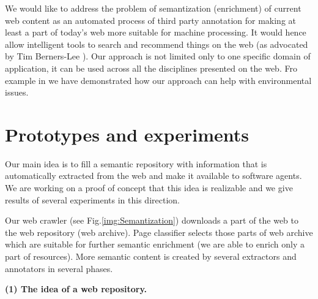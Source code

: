 \documentclass{sig-alternate}
\begin{document}
We would like to address the problem of semantization (enrichment) of current web content as an automated process of third party annotation for making at least a part of today's web more suitable for machine processing. It would hence allow intelligent tools to search and recommend things on the web (as advocated by Tim Berners-Lee \cite{biblio:LeeWebThings}). Our approach is not limited only to one specific domain of application, it can be used across all the disciplines presented on the web. Fro example in \cite{biblio:eEnvi} we have demonstrated how our approach can help with environmental issues.



\section{Prototypes and experiments}

Our main idea is to fill a semantic repository with information that is automatically extracted from the web and make it available to software agents. We are working on a proof of concept that this idea is realizable and we give results of several experiments in this direction.

Our web crawler (see Fig.\ref{img:Semantization})
downloads a part of the web to the web repository (web archive). 
Page classifier selects those parts of web archive which are suitable for further semantic enrichment (we are able to enrich only a part of resources). More semantic content is created by several extractors and annotators in several phases. %



\textbf{(1) The idea of a web repository.}  

\end{document}
